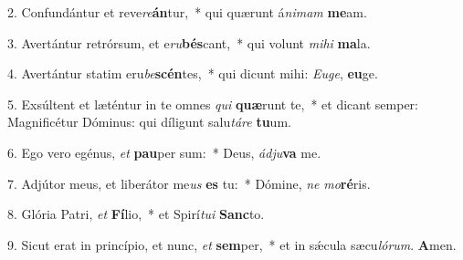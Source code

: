 2. Confundántur et reve\textit{re}\textbf{án}tur,~*  qui quærunt á\textit{ni}\textit{mam} \textbf{me}am.\

3. Avertántur retrórsum, et e\textit{ru}\textbf{bés}cant,~*  qui volunt \textit{mi}\textit{hi} \textbf{ma}la.\

4. Avertántur statim eru\textit{be}\textbf{scén}tes,~*  qui dicunt mihi: \textit{Eu}\textit{ge}, \textbf{eu}ge.\

5. Exsúltent et læténtur in te omnes \textit{qui} \textbf{quæ}runt te,~*  et dicant semper: Magnificétur Dóminus: qui díligunt salu\textit{tá}\textit{re} \textbf{tu}um.\

6. Ego vero egénus, \textit{et} \textbf{pau}per sum:~*  Deus, \textit{ád}\textit{ju}\textbf{va} me.\

7. Adjútor meus, et liberátor me\textit{us} \textbf{es} tu:~*  Dómine, \textit{ne} \textit{mo}\textbf{ré}ris.\

8. Glória Patri, \textit{et} \textbf{Fí}lio,~*  et Spirí\textit{tu}\textit{i} \textbf{Sanc}to.\

9. Sicut erat in princípio, et nunc, \textit{et} \textbf{sem}per,~*  et in sǽcula sæcu\textit{ló}\textit{rum}. \textbf{A}men.\

